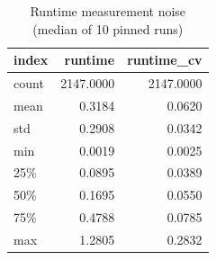\begin{table}[t]
\centering
\caption{Runtime measurement noise (median of 10 pinned runs)}
\label{tab:rq3-runtime-noise}
\begin{tabular}{lrr}
\toprule
index & runtime & runtime\_cv \\
\midrule
count & 2147.0000 & 2147.0000 \\
mean & 0.3184 & 0.0620 \\
std & 0.2908 & 0.0342 \\
min & 0.0019 & 0.0025 \\
25\% & 0.0895 & 0.0389 \\
50\% & 0.1695 & 0.0550 \\
75\% & 0.4788 & 0.0785 \\
max & 1.2805 & 0.2832 \\
\bottomrule
\end{tabular}
\end{table}
